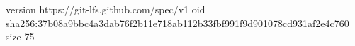 version https://git-lfs.github.com/spec/v1
oid sha256:37b08a9bbc4a3dab76f2b11e718ab112b33fbf991f9d901078cd931af2e4c760
size 75
